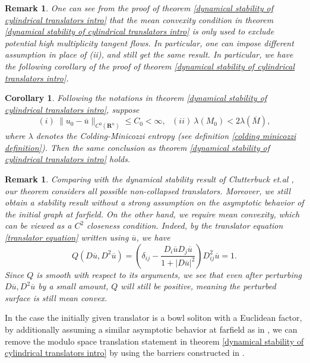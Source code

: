 \documentclass[pdflatex,sn-mathphys-num]{sn-jnl}%
\newtheorem{corollary}[theorem]{Corollary}
\newtheorem{remark}[theorem]{Remark}
\begin{document}
\begin{remark}
One can see from the proof of theorem \ref{dynamical stability of cylindrical translators intro} that the mean convexity condition in theorem \ref{dynamical stability of cylindrical translators intro} is only used to exclude potential high multiplicity tangent flows. In particular, one can impose different assumption in place of (ii), and still get the same result. In particular, we have the following corollary of the proof of theorem \ref{dynamical stability of cylindrical translators intro}.    
\end{remark}
\begin{corollary}\label{alternative dynamical stability}
    Following the notations in theorem \ref{dynamical stability of cylindrical translators intro}, suppose
    \begin{equation}\label{alternative assumption on initial data cylindrical flows}
        (i) \ \|u_0 - \overline{u}\|_{C^0(\mathbf{R}^n)} \leq C_0 < \infty, \ \ \ (ii) \ \lambda(M_0) < 2\lambda(\overline{M}),
    \end{equation}
    where $\lambda$ denotes the Colding-Minicozzi entropy (see definition \ref{colding minicozzi definition}). Then the same conclusion as theorem \ref{dynamical stability of cylindrical translators intro} holds.
\end{corollary}
\begin{remark}
    Comparing with the dynamical stability result of Clutterbuck et.al \cite{bowlstability}, our theorem considers all possible non-collapsed translators. Moreover, we still obtain a stability result without a strong assumption on the asymptotic behavior of the initial graph at farfield. On the other hand, we require mean convexity, which can be viewed as a $C^2$ closeness condition. Indeed, by the translator equation \eqref{translator equation} written using $\overline{u}$, we have
    \begin{equation}
        Q(D\overline{u}, D^2\overline{u}) = (\delta_{ij} - \frac{D_i\overline{u}D_j\overline{u}}{1 + |D\overline{u}|^2})D^2_{ij}\overline{u} = 1.
    \end{equation}
    Since $Q$ is smooth with respect to its arguments, we see that even after perturbing $D\overline{u}, D^2\overline{u}$ by a small amount, $Q$ will still be positive, meaning the perturbed surface is still mean convex.
\end{remark}
In the case the initially given translator is a bowl soliton with a Euclidean factor, by additionally assuming a similar asymptotic behavior at farfield as in \cite{bowlstability}, we can remove the modulo space translation statement in theorem \ref{dynamical stability of cylindrical translators intro} by using the barriers constructed in \cite{bowlstability}.
\end{document}
